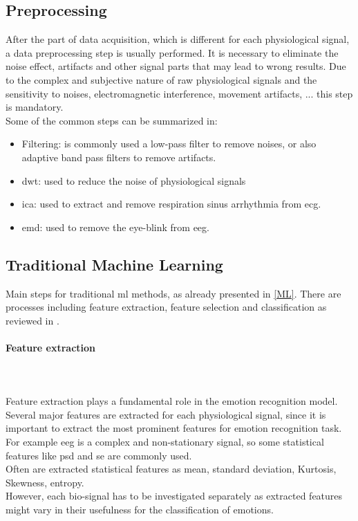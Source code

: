 \subsection{Preprocessing}
After the part of data acquisition, which is different for each physiological signal, a data preprocessing step is usually performed. It is necessary to eliminate the noise effect, artifacts and other signal parts that may lead to wrong results. Due to the complex and subjective nature of raw physiological signals and the sensitivity to noises, electromagnetic interference, movement artifacts, ... this step is mandatory.
\\ \indent
Some of the common steps can be summarized in:
\begin{itemize}
	\item Filtering: is commonly used a low-pass filter to remove noises, or also adaptive band pass filters to remove artifacts.
	\item \gls{dwt}: used to reduce the noise of physiological signals
	\item \gls{ica}: used to extract and remove respiration sinus arrhythmia from \gls{ecg}.
	\item \gls{emd}: used to remove the eye-blink from \gls{eeg}.
\end{itemize}

\subsection{Traditional Machine Learning}
Main steps for traditional \gls{ml} methods, as already presented in \ref{ML}. There are processes including feature extraction, feature selection and classification as reviewed in \cite{jerritta2011physiological}.

\paragraph{Feature extraction}
\mbox{} \\ \\ \indent
Feature extraction plays a fundamental role in the emotion recognition model. Several major features are extracted for each physiological signal, since it is important to extract the most prominent features for emotion recognition task. For example \gls{eeg} is a complex and non-stationary signal, so some statistical features like \gls{psd} and \gls{se} are commonly used.
\\
Often are extracted statistical features as mean, standard deviation, Kurtosis, Skewness, entropy.
\\
However, each bio-signal has to be investigated separately as extracted features might vary in their usefulness for the classification of emotions.

